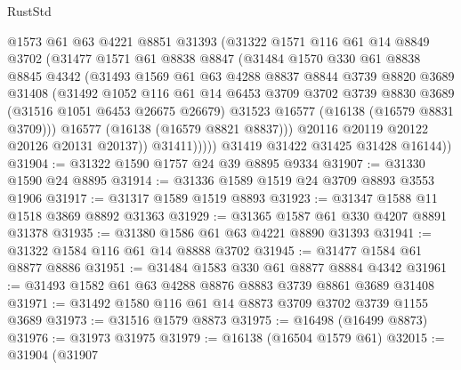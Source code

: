 \begin{lexlean}{RustStd}
\begin{coremodule}
                @1573
                @61
                @63
                @4221
                @8851
                @31393
                (@31322
                  @1571
                  @116
                  @61
                  @14
                  @8849
                  @3702
                  (@31477
                    @1571
                    @61
                    @8838
                    @8847
                    (@31484
                      @1570
                      @330
                      @61
                      @8838
                      @8845
                      @4342
                      (@31493
                        @1569
                        @61
                        @63
                        @4288
                        @8837
                        @8844
                        @3739
                        @8820
                        @3689
                        @31408
                        (@31492
                          @1052
                          @116
                          @61
                          @14
                          @6453
                          @3709
                          @3702
                          @3739
                          @8830
                          @3689
                          (@31516 @1051 @6453 @26675 @26679)
                          @31523
                          @16577
                          (@16138 (@16579 @8831 @3709)))
                        @16577
                        (@16138 (@16579 @8821 @8837)))
                      @20116
                      @20119
                      @20122
                      @20126
                      @20131
                      @20137))
                  @31411)))))
        @31419
        @31422
        @31425
        @31428
        @16144))
@31904 := @31322 @1590 @1757 @24 @39 @8895 @9334
@31907 := @31330 @1590 @24 @8895
@31914 := @31336 @1589 @1519 @24 @3709 @8893 @3553 @1906
@31917 := @31317 @1589 @1519 @8893
@31923 := @31347 @1588 @11 @1518 @3869 @8892 @31363
@31929 := @31365 @1587 @61 @330 @4207 @8891 @31378
@31935 := @31380 @1586 @61 @63 @4221 @8890 @31393
@31941 := @31322 @1584 @116 @61 @14 @8888 @3702
@31945 := @31477 @1584 @61 @8877 @8886
@31951 := @31484 @1583 @330 @61 @8877 @8884 @4342
@31961 := @31493 @1582 @61 @63 @4288 @8876 @8883 @3739 @8861 @3689 @31408
@31971 := @31492 @1580 @116 @61 @14 @8873 @3709 @3702 @3739 @1155 @3689
@31973 := @31516 @1579 @8873
@31975 := @16498 (@16499 @8873)
@31976 := @31973 @31975
@31979 := @16138 (@16504 @1579 @61)
@32015 := @31904
    (@31907

\end{coremodule}
\end{lexlean}
